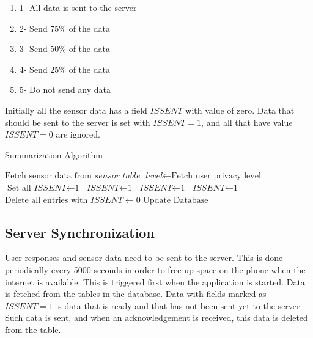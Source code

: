 \begin{enumerate}
	\item 1- All data is sent to the server
	\item 2- Send 75\% of the data
    \item 3- Send 50\% of the data
    \item 4- Send 25\% of the data
    \item 5- Do not send any data
\end{enumerate}

Initially all the sensor data has a field $ISSENT$ with value of zero. Data that should be sent to the server is set with $ISSENT=1$, and all that have value $ISSENT=0$ are ignored.

\begin{algorithm}
\caption{Summarization Algorithm}\label{sum}
\begin{algorithmic}[1]
\State $\text{Fetch sensor data from } \textit{sensor table}$
\State $\textit{level} \gets \text{Fetch user privacy level}$
  \State $\text{Set all } \textit{ISSENT} \gets \text{1}$
 	 \State $\textit{ISSENT} \gets \text{1}$
 	\EndFor 
{}
 	 \State $\textit{ISSENT} \gets \text{1}$
 	\EndFor
{}
 	 \State $\textit{ISSENT} \gets \text{1}$
 	\EndFor
\EndIf
\State $\text{Delete all entries with } \textit{ISSENT} \gets 0$
\State $\text{Update Database}$
\EndFor
\EndProcedure
\end{algorithmic}
\end{algorithm}

\subsection{Server Synchronization} \label{job}

User responses and sensor data need to be sent to the server. This is done periodically every 5000 seconds in order to free up space on the phone when the internet is available. This is triggered first when the application is started. Data is fetched from the tables in the database. Data with fields marked as $ISSENT=1$ is data that is ready and that has not been sent yet to the server. Such data is sent, and when an acknowledgement is received, this data is deleted from the table.

